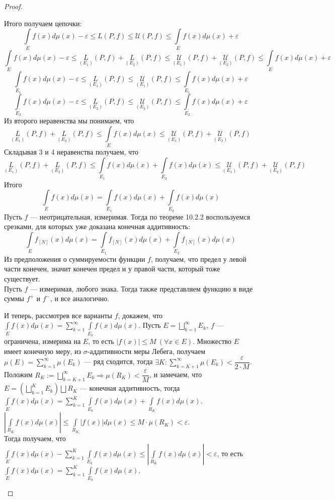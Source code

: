 \begin{proof}
\begin{enumerate}
	Итого получаем цепочки: 
	$$\int\limits_E f(x)d\mu(x)-\varepsilon\leqslant
	L(P,f) \leqslant\mathcal{U}(P,f) \leqslant
	\int\limits_E f(x)d\mu(x)+\varepsilon$$
	$$\int\limits_E f(x)d\mu(x)-\varepsilon\leqslant
		\underset{(E_1)}{L}(P,f)+\underset{(E_2)}{L}(P,f)\leqslant
	\underset{(E_1)}{\mathcal{U}}(P,f)+\underset{(E_2)}{\mathcal{U}}(P,f)\leqslant
	\int\limits_E f(x)d\mu(x)+\varepsilon$$
	$$\int\limits_{E_1}f(x)d\mu(x)-\varepsilon \leqslant \underset{(E_1)}{L}(P,f) \leqslant \underset{(E_1)}{\mathcal{U}}(P,f)\leqslant \int\limits_{E_1}f(x)d\mu(x)+\varepsilon$$
	$$\int\limits_{E_2}f(x)d\mu(x)-\varepsilon \leqslant \underset{(E_2)}{L}(P,f) \leqslant \underset{(E_2)}{\mathcal{U}}(P,f)\leqslant \int\limits_{E_2}f(x)d\mu(x)+\varepsilon$$
	 Из второго неравенства мы понимаем, что
	 $$\underset{(E_1)}{L}(P,f)+\underset{(E_2)}{L}(P,f)\leqslant\int\limits_E f(x)d\mu(x) \leqslant
	\underset{(E_1)}{\mathcal{U}}(P,f)+\underset{(E_2)}{\mathcal{U}}(P,f)$$
	Складывая 3 и 4 неравенства получаем, что
	$$\underset{(E_1)}{L}(P,f)+\underset{(E_2)}{L}(P,f)\leqslant\int\limits_{E_1}f(x)d\mu(x)+\int\limits_{E_2}f(x)d\mu(x) \leqslant
	\underset{(E_1)}{\mathcal{U}}(P,f)+\underset{(E_2)}{\mathcal{U}}(P,f)$$
	Итого $$\int\limits_E f(x)d\mu(x)=\int\limits_{E_1} f(x)d\mu(x)+\int\limits_{E_2} f(x)d\mu(x)$$
	Пусть $f$ --- неотрицательная, измеримая. Тогда по теореме 10.2.2 воспользуемся срезками, для которых уже доказана конечная аддитивность:
	$$\int\limits_{E}f_{[N]}(x)d\mu(x)=\int\limits_{E_1}f_{[N]}(x)d\mu(x)+\int\limits_{E_2}f_{[N]}(x)d\mu(x)$$
	Из предположения о суммируемости функции $f$, получаем, что предел у левой части конечен, значит конечен предел и у правой части, который тоже существует.\\
	Пусть $f$ --- измеримая, любого знака. Тогда также представляем функцию в виде суммы $f^+$ и $f^-$, и все аналогично.
	
	И теперь, рассмотрев все варианты $f$, докажем, что $\int\limits_E f(x)d\mu(x) = \sum\limits_{k=1}^\infty\int\limits_{E_k} f(x)d\mu(x)$. Пусть $E=\bigsqcup\limits_{k=1}^\infty E_k,\  f$ --- ограничена, измерима на $E$, то есть 
	${|f(x)|\leqslant M\ (\forall x\in E)}$. Множество $E$ имеет конечную меру, из $\sigma$-аддитивности меры Лебега, получаем $\mu(E)=\sum\limits_{k=1}^\infty \mu(E_k)$ --- ряд сходится, тогда
	${\exists K: \sum\limits_{k=K+1}^\infty \mu(E_k)<\dfrac{\varepsilon}{2\cdot M}}$. \\
	Положим $R_K:=\bigsqcup\limits_{k=K+1}^\infty E_k \Rightarrow \mu(R_K)<\dfrac{\varepsilon}{M}$, и замечаем, что $E=(\bigsqcup\limits_{k=1}^K E_k)\bigsqcup R_K$ --- конечная аддитивность, тогда $\int\limits_{E}f(x) d\mu(x)=\sum\limits_{k=1}^K\int\limits_{E_k}f(x)d\mu(x)+\int\limits_{R_K}f(x)d\mu(x)$.\\
	$|\int\limits_{R_K}f(x)d\mu(x)|\leqslant\int\limits_{R_K}|f(x)|d\mu(x)\leqslant M\cdot \mu(R_K)<\varepsilon$. \\Тогда получаем, что $\int\limits_{E}f(x) d\mu(x)-\sum\limits_{k=1}^K\int\limits_{E_k}f(x)d\mu(x)\leqslant|\int\limits_{R_K}f(x)d\mu(x)|<\varepsilon$, то есть $\int\limits_{E}f(x) d\mu(x)=\sum\limits_{k=1}^K\int\limits_{E_k}f(x)d\mu(x)$.
	

\end{enumerate}
\end{proof}
